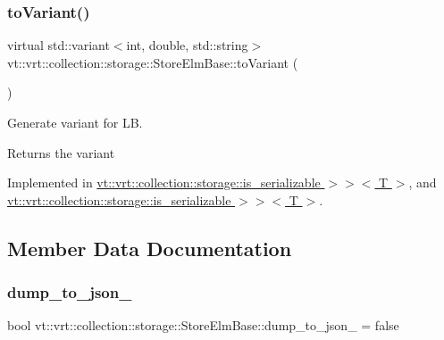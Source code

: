 \subsubsection{\texorpdfstring{to\+Variant()}{toVariant()}}
{\footnotesize\ttfamily virtual std\+::variant$<$int, double, std\+::string$>$ vt\+::vrt\+::collection\+::storage\+::\+Store\+Elm\+Base\+::to\+Variant (\begin{DoxyParamCaption}{ }\end{DoxyParamCaption})\hspace{0.3cm}{\ttfamily [pure virtual]}}



Generate variant for LB. 

\begin{DoxyReturn}{Returns}
the variant 
\end{DoxyReturn}


Implemented in \hyperlink{structvt_1_1vrt_1_1collection_1_1storage_1_1_store_elm_3_01_t_00_01typename_01std_1_1enable__if_f645d7011e081ebef1092328b0917bfc_a7eea2c008b62018472a0b5f544320788}{vt\+::vrt\+::collection\+::storage\+::is\+\_\+serializable $>$$>$$<$ T $>$}, and \hyperlink{structvt_1_1vrt_1_1collection_1_1storage_1_1_store_elm_3_01_t_00_01typename_01std_1_1enable__if_947e0655769addb625fb511f777768bd_a7eea2c008b62018472a0b5f544320788}{vt\+::vrt\+::collection\+::storage\+::is\+\_\+serializable $>$$>$$<$ T $>$}.



\subsection{Member Data Documentation}
\mbox{\label{structvt_1_1vrt_1_1collection_1_1storage_1_1_store_elm_base_a7bd87e77194a384ecb0a7450d9e7a24a}} 
\subsubsection{\texorpdfstring{dump\+\_\+to\+\_\+json\+\_\+}{dump\_to\_json\_}}
{\footnotesize\ttfamily bool vt\+::vrt\+::collection\+::storage\+::\+Store\+Elm\+Base\+::dump\+\_\+to\+\_\+json\+\_\+ = false\hspace{0.3cm}{\ttfamily [protected]}}

